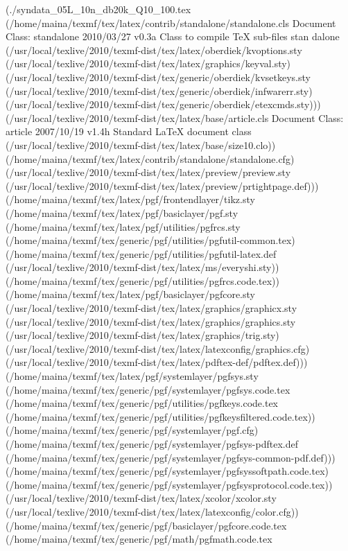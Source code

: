 \begin{center}
\begin{center}
(./syndata_05L_10n_db20k_Q10_100.tex
(/home/maina/texmf/tex/latex/contrib/standalone/standalone.cls
Document Class: standalone 2010/03/27 v0.3a Class to compile TeX sub-files stan
dalone
(/usr/local/texlive/2010/texmf-dist/tex/latex/oberdiek/kvoptions.sty
(/usr/local/texlive/2010/texmf-dist/tex/latex/graphics/keyval.sty)
(/usr/local/texlive/2010/texmf-dist/tex/generic/oberdiek/kvsetkeys.sty
(/usr/local/texlive/2010/texmf-dist/tex/generic/oberdiek/infwarerr.sty)
(/usr/local/texlive/2010/texmf-dist/tex/generic/oberdiek/etexcmds.sty)))
(/usr/local/texlive/2010/texmf-dist/tex/latex/base/article.cls
Document Class: article 2007/10/19 v1.4h Standard LaTeX document class
(/usr/local/texlive/2010/texmf-dist/tex/latex/base/size10.clo))
(/home/maina/texmf/tex/latex/contrib/standalone/standalone.cfg)
(/usr/local/texlive/2010/texmf-dist/tex/latex/preview/preview.sty
(/usr/local/texlive/2010/texmf-dist/tex/latex/preview/prtightpage.def)))
(/home/maina/texmf/tex/latex/pgf/frontendlayer/tikz.sty
(/home/maina/texmf/tex/latex/pgf/basiclayer/pgf.sty
(/home/maina/texmf/tex/latex/pgf/utilities/pgfrcs.sty
(/home/maina/texmf/tex/generic/pgf/utilities/pgfutil-common.tex)
(/home/maina/texmf/tex/generic/pgf/utilities/pgfutil-latex.def
(/usr/local/texlive/2010/texmf-dist/tex/latex/ms/everyshi.sty))
(/home/maina/texmf/tex/generic/pgf/utilities/pgfrcs.code.tex))
(/home/maina/texmf/tex/latex/pgf/basiclayer/pgfcore.sty
(/usr/local/texlive/2010/texmf-dist/tex/latex/graphics/graphicx.sty
(/usr/local/texlive/2010/texmf-dist/tex/latex/graphics/graphics.sty
(/usr/local/texlive/2010/texmf-dist/tex/latex/graphics/trig.sty)
(/usr/local/texlive/2010/texmf-dist/tex/latex/latexconfig/graphics.cfg)
(/usr/local/texlive/2010/texmf-dist/tex/latex/pdftex-def/pdftex.def)))
(/home/maina/texmf/tex/latex/pgf/systemlayer/pgfsys.sty
(/home/maina/texmf/tex/generic/pgf/systemlayer/pgfsys.code.tex
(/home/maina/texmf/tex/generic/pgf/utilities/pgfkeys.code.tex
(/home/maina/texmf/tex/generic/pgf/utilities/pgfkeysfiltered.code.tex))
(/home/maina/texmf/tex/generic/pgf/systemlayer/pgf.cfg)
(/home/maina/texmf/tex/generic/pgf/systemlayer/pgfsys-pdftex.def
(/home/maina/texmf/tex/generic/pgf/systemlayer/pgfsys-common-pdf.def)))
(/home/maina/texmf/tex/generic/pgf/systemlayer/pgfsyssoftpath.code.tex)
(/home/maina/texmf/tex/generic/pgf/systemlayer/pgfsysprotocol.code.tex))
(/usr/local/texlive/2010/texmf-dist/tex/latex/xcolor/xcolor.sty
(/usr/local/texlive/2010/texmf-dist/tex/latex/latexconfig/color.cfg))
(/home/maina/texmf/tex/generic/pgf/basiclayer/pgfcore.code.tex
(/home/maina/texmf/tex/generic/pgf/math/pgfmath.code.tex

\end{center}
\end{center}
